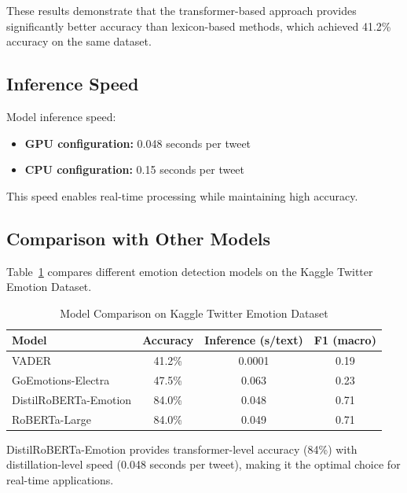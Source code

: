 These results demonstrate that the transformer-based approach provides significantly better accuracy than lexicon-based methods, which achieved 41.2\% accuracy on the same dataset.

\subsection{Inference Speed}

Model inference speed:

\begin{itemize}
\item \textbf{GPU configuration:} 0.048 seconds per tweet
\item \textbf{CPU configuration:} 0.15 seconds per tweet
\end{itemize}

This speed enables real-time processing while maintaining high accuracy.

\subsection{Comparison with Other Models}

Table~\ref{tab:model_eval} compares different emotion detection models on the Kaggle Twitter Emotion Dataset.

\begin{table}[htbp]
\centering
\caption{Model Comparison on Kaggle Twitter Emotion Dataset}
\label{tab:model_eval}
\begin{tabular}{lccc}
\hline
\textbf{Model} & \textbf{Accuracy} & \textbf{Inference (s/text)} & \textbf{F1 (macro)} \\
\hline
VADER \cite{hutto2014vader} & 41.2\% & 0.0001 & 0.19 \\
GoEmotions-Electra \cite{go2018emotions} & 47.5\% & 0.063 & 0.23 \\
DistilRoBERTa-Emotion \cite{hartmann2023emotion} & 84.0\% & 0.048 & 0.71 \\
RoBERTa-Large \cite{liu2019roberta} & 84.0\% & 0.049 & 0.71 \\
\hline
\end{tabular}
\end{table}

DistilRoBERTa-Emotion provides transformer-level accuracy (84\%) with distillation-level speed (0.048 seconds per tweet), making it the optimal choice for real-time applications.



